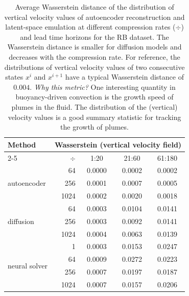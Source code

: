 \begin{subappendices}
\begin{table}[h]
    \centering
    \caption{Average Wasserstein distance of the distribution of vertical velocity values of autoencoder reconstruction and latent-space emulation at different compression rates ($\div$) and lead time horizons for the RB dataset. The Wasserstein distance is smaller for diffusion models and decreases with the compression rate. For reference, the distributions of vertical velocity values of two consecutive states $x^i$ and $x^{i+1}$ have a typical Wasserstein distance of $0.004$. \emph{Why this metric?} One interesting quantity in buoyancy-driven convection is the growth speed of plumes in the fluid. The distribution of the (vertical) velocity values is a good summary statistic for tracking the growth of plumes.}
    \footnotesize
    \begin{tabular}{lrccc}
        \toprule
        \multirow[c]{2}{*}{Method} & \multicolumn{4}{c}{Wasserstein (vertical velocity field)} \\
        \cmidrule(lr){2-5}
         & $\div$ & 1:20 & 21:60 & 61:180 \\
        \midrule
        \multirow[c]{3}{*}{autoencoder}
        & 64   & 0.0000 & 0.0002 & 0.0002 \\
        & 256  & 0.0001 & 0.0007 & 0.0005 \\
        & 1024 & 0.0002 & 0.0020 & 0.0018 \\
        \midrule
        \multirow[c]{3}{*}{diffusion}
        & 64   & 0.0003 & 0.0104 & 0.0141 \\
        & 256  & 0.0003 & 0.0092 & 0.0141 \\
        & 1024 & 0.0004 & 0.0063 & 0.0139 \\
        \midrule
        \multirow[c]{4}{*}{neural solver}
        & 1    & 0.0003 & 0.0153 & 0.0247 \\
        & 64   & 0.0009 & 0.0272 & 0.0223 \\
        & 256  & 0.0007 & 0.0197 & 0.0187 \\
        & 1024 & 0.0007 & 0.0157 & 0.0206 \\
        \bottomrule
    \end{tabular}
    \label{tab:wasserstein-rb-vs-compression}
\end{table}


\end{subappendices}
